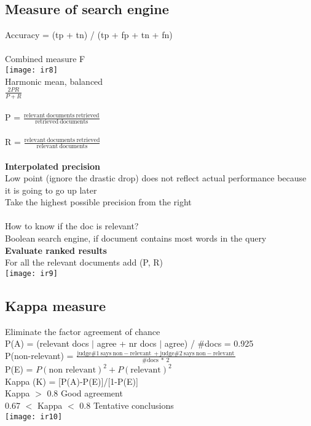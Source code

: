 \documentclass[11pt]{article}
\begin{document}
\begin{multicols*}{3}
\subsection*{Measure of search engine}
Accuracy = (tp + tn) / (tp + fp + tn + fn)\\\\
Combined measure F\\
\texttt{[image: ir8]}\\
Harmonic mean, balanced \\
$\frac{2PR}{P + R}$\\\\
P = $\mathrm{\frac{relevant\ documents\ retrieved}{retrieved\ documents}}$\\\\
R = $\mathrm{\frac{relevant\ documents\ retrieved}{relevant\ documents}}$\\
\\
\textbf{Interpolated precision}\\
Low point (ignore the drastic drop) does not reflect actual performance because it is going to go up later\\
Take the highest possible precision from the right\\
\\
How to know if the doc is relevant?\\
Boolean search engine, if document contains most words in the query\\
\textbf{Evaluate ranked results}\\
For all the relevant documents add (P, R)\\
\texttt{[image: ir9]}
\subsection*{Kappa measure}
Eliminate the factor agreement of chance\\
\)\)\)
P(A) = (relevant docs $|$ agree + nr docs $|$ agree) / $\#$docs = 0.925\\
P(non-relevant) = $\mathrm{\frac{judge\#1\ says\ non-relevant\ + judge\#2\ says\ non-relevant\ }{\# docs\ \ast\ 2\ }}$\\
P(E) = $P(\textrm{non relevant})^{2} + P(\textrm{relevant})^{2}$\\
Kappa (K) = [P(A)-P(E)]/[1-P(E)]\\
 Kappa $>$ 0.8 Good agreement\\
0.67 $<$ Kappa $<$ 0.8 Tentative conclusions\\
\texttt{[image: ir10]}

\end{multicols*}
\end{document}
